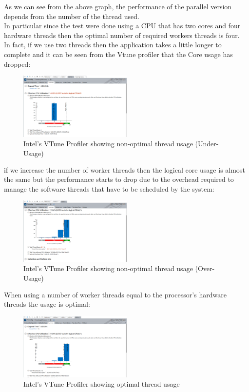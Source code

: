 \documentclass[10pt,twocolumn,letterpaper]{article}
\begin{document}
As we can see from the above graph, the performance of the parallel version depends from the number of the thread used.\\
In particular since the test were done using a CPU that has two cores and four hardware threads then the optimal number of required 
workers threads is four.\\
In fact, if we use two threads then the application takes a little longer to complete and it can be seen from the Vtune profiler that
the Core usage has dropped:\\
\begin{figure}[H]
\centering
\includegraphics[width=0.5\textwidth]{vtune_profiler_under_usage}
\caption{Intel's VTune Profiler showing non-optimal thread usage (Under-Usage)}
\end{figure}
if we increase the number of worker threads then the logical core usage is almost the same but the performance starts to drop due to the 
overhead required to manage the software threads that have to be scheduled by the system:\\
\begin{figure}[H]
\centering
\includegraphics[width=0.5\textwidth]{vtune_profiler_over_usage}
\caption{Intel's VTune Profiler showing non-optimal thread usage (Over-Usage)}
\end{figure}
When using a number of worker threads equal to the processor's hardware threads the usage is optimal:\\
\begin{figure}[H]
\centering
\includegraphics[width=0.5\textwidth]{vtune_profiler_ideal_usage}
\caption{Intel's VTune Profiler showing optimal thread usage}
\end{figure}
\end{document}
